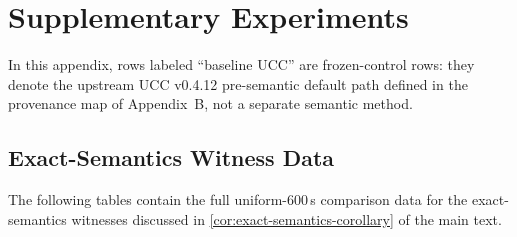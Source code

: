 \section{Supplementary Experiments}
\label{app:supplementary-experiments}

In this appendix, rows labeled ``baseline UCC'' are frozen-control rows:
they denote the upstream UCC v0.4.12 pre-semantic default path defined in the
provenance map of Appendix~B, not a separate semantic method.

\subsection{Exact-Semantics Witness Data}
\label{app:witness-data}

The following tables contain the full uniform-600\,s comparison data for
the exact-semantics witnesses discussed in
\cref{cor:exact-semantics-corollary} of the main text.

\begin{table}[htbp]
\centering
\scriptsize
{}
\caption{Uniform-600\,s comparison on the rational CP finite-range
witness. Completed cells report gates/depth/cx; other entries are status
outcomes and are not scored as structural wins. The family is certified
only for $R < T = 131040$, with per-transducer tail constants. No
external row is a formal theorem instance.}
\label{tab:rational-cp-600}
\end{table}

